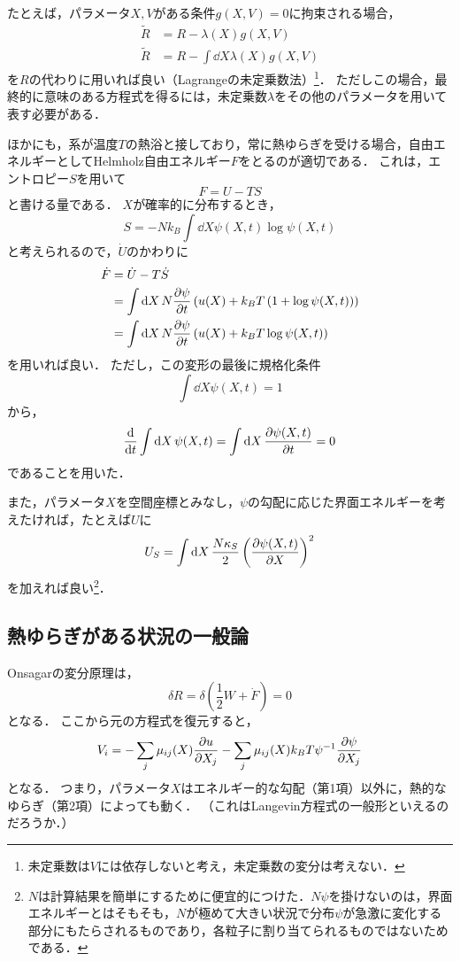 \documentclass[a4paper,11pt]{jsarticle}
\begin{document}
たとえば，パラメータ$X,V$がある条件$g(X,V)=0$に拘束される場合，
\begin{align}
  \tilde{R} &= R - \lambda(X) g(X,V) \\
  \tilde{R} &= R - \int \dd{X} \lambda(X) g(X,V)
\end{align}
を$R$の代わりに用いれば良い（Lagrangeの未定乗数法）\footnote{未定乗数は$V$には依存しないと考え，未定乗数の変分は考えない．}．
ただしこの場合，最終的に意味のある方程式を得るには，未定乗数$\lambda$をその他のパラメータを用いて表す必要がある．

ほかにも，系が温度$T$の熱浴と接しており，常に熱ゆらぎを受ける場合，自由エネルギーとしてHelmholz自由エネルギー$F$をとるのが適切である．
これは，エントロピー$S$を用いて
\begin{equation}
  F = U - TS
\end{equation}
と書ける量である．
$X$が確率的に分布するとき，
\begin{equation}
  S = - Nk_B\int \dd{X} \psi(X,t) \log{\psi(X,t)}
\end{equation}
と考えられるので，$\dot{U}$のかわりに
\begin{align}
  \dot{F} &= \dot{U} - T\dot{S} \notag\\
  &= \int \dd{X} N\pdv{\psi}{t} \left(u(X)+k_B T\left(1 + \log{\psi(X,t)}\right) \right) \notag \\
  &= \int \dd{X} N\pdv{\psi}{t} \left(u(X)+k_B T\log{\psi(X,t)}\right)
\end{align}
を用いれば良い．
ただし，この変形の最後に規格化条件
\begin{equation}
  \int \dd{X} \psi(X,t) = 1
\end{equation}
から，
\begin{equation}
  \dv{t}\int \dd{X} \psi(X,t) = \int \dd{X} \pdv{\psi(X,t)}{t} = 0
\end{equation}
であることを用いた．

また，パラメータ$X$を空間座標とみなし，$\psi$の勾配に応じた界面エネルギーを考えたければ，たとえば$U$に
\begin{equation}
  U_S = \int \dd{X} \frac{N\kappa_S}{2} \left(\pdv{\psi(X,t)}{X}\right)^2
\end{equation}
を加えれば良い\footnote{$N$は計算結果を簡単にするために便宜的につけた．$N\psi$を掛けないのは，界面エネルギーとはそもそも，$N$が極めて大きい状況で分布$\psi$が急激に変化する部分にもたらされるものであり，各粒子に割り当てられるものではないためである．}．

\subsection{熱ゆらぎがある状況の一般論}
Onsagarの変分原理は，
\begin{equation}
  \delta R = \delta \left(\frac{1}{2} W + \dot{F}\right) = 0
\end{equation}
となる．
ここから元の方程式を復元すると，
\begin{equation}
  V_i = - \sum_{j} \mu_{ij}(X)\pdv{u}{X_j} - \sum_{j} \mu_{ij}(X)k_BT \psi^{-1} \pdv{\psi}{X_j}
\end{equation}
となる．
つまり，パラメータ$X$はエネルギー的な勾配（第1項）以外に，熱的なゆらぎ（第2項）によっても動く．
（これはLangevin方程式の一般形といえるのだろうか．）
\end{document}

